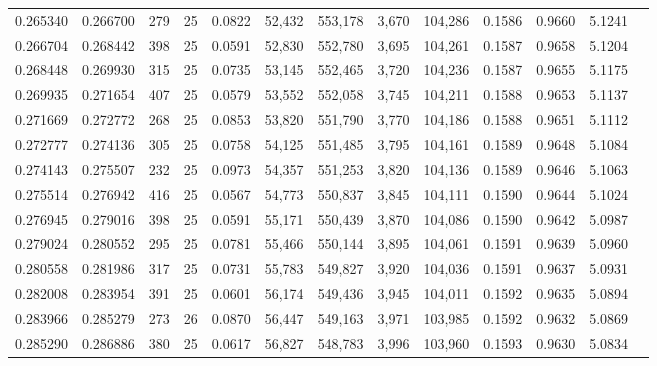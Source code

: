 \begin{tabular}{rrrrrrrrrrrrr}
0.265340 & 0.266700 &   279 &  25 &                                     0.0822 &  52,432 & 553,178 &   3,670 & 104,286 & 0.1586 & 0.9660 & 5.1241 \\
0.266704 & 0.268442 &   398 &  25 &                                     0.0591 &  52,830 & 552,780 &   3,695 & 104,261 & 0.1587 & 0.9658 & 5.1204 \\
0.268448 & 0.269930 &   315 &  25 &                                     0.0735 &  53,145 & 552,465 &   3,720 & 104,236 & 0.1587 & 0.9655 & 5.1175 \\
0.269935 & 0.271654 &   407 &  25 &                                     0.0579 &  53,552 & 552,058 &   3,745 & 104,211 & 0.1588 & 0.9653 & 5.1137 \\
0.271669 & 0.272772 &   268 &  25 &                                     0.0853 &  53,820 & 551,790 &   3,770 & 104,186 & 0.1588 & 0.9651 & 5.1112 \\
0.272777 & 0.274136 &   305 &  25 &                                     0.0758 &  54,125 & 551,485 &   3,795 & 104,161 & 0.1589 & 0.9648 & 5.1084 \\
0.274143 & 0.275507 &   232 &  25 &                                     0.0973 &  54,357 & 551,253 &   3,820 & 104,136 & 0.1589 & 0.9646 & 5.1063 \\
0.275514 & 0.276942 &   416 &  25 &                                     0.0567 &  54,773 & 550,837 &   3,845 & 104,111 & 0.1590 & 0.9644 & 5.1024 \\
0.276945 & 0.279016 &   398 &  25 &                                     0.0591 &  55,171 & 550,439 &   3,870 & 104,086 & 0.1590 & 0.9642 & 5.0987 \\
0.279024 & 0.280552 &   295 &  25 &                                     0.0781 &  55,466 & 550,144 &   3,895 & 104,061 & 0.1591 & 0.9639 & 5.0960 \\
0.280558 & 0.281986 &   317 &  25 &                                     0.0731 &  55,783 & 549,827 &   3,920 & 104,036 & 0.1591 & 0.9637 & 5.0931 \\
0.282008 & 0.283954 &   391 &  25 &                                     0.0601 &  56,174 & 549,436 &   3,945 & 104,011 & 0.1592 & 0.9635 & 5.0894 \\
0.283966 & 0.285279 &   273 &  26 &                                     0.0870 &  56,447 & 549,163 &   3,971 & 103,985 & 0.1592 & 0.9632 & 5.0869 \\
0.285290 & 0.286886 &   380 &  25 &                                     0.0617 &  56,827 & 548,783 &   3,996 & 103,960 & 0.1593 & 0.9630 & 5.0834 \\

\end{tabular}
